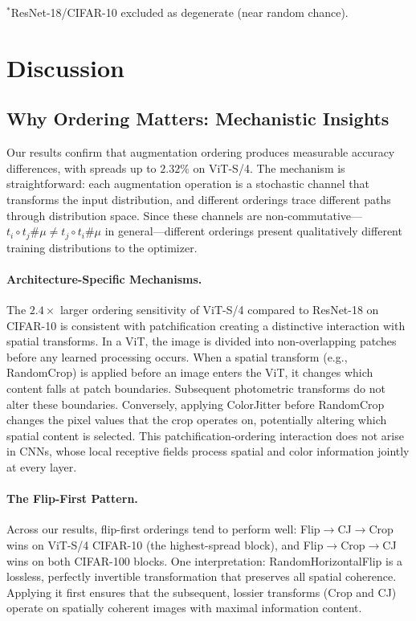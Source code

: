 \documentclass{article}
\begin{document}
$^*$ResNet-18/CIFAR-10 excluded as degenerate (near random chance).

\section{Discussion}

\subsection{Why Ordering Matters: Mechanistic Insights}

Our results confirm that augmentation ordering produces measurable accuracy differences, with spreads up to $2.32\%$ on ViT-S/4. The mechanism is straightforward: each augmentation operation is a stochastic channel that transforms the input distribution, and different orderings trace different paths through distribution space. Since these channels are non-commutative---$t_i \circ t_j \# \mu \neq t_j \circ t_i \# \mu$ in general---different orderings present qualitatively different training distributions to the optimizer.

\paragraph{Architecture-Specific Mechanisms.}
The $2.4\times$ larger ordering sensitivity of ViT-S/4 compared to ResNet-18 on CIFAR-10 is consistent with patchification creating a distinctive interaction with spatial transforms. In a ViT, the image is divided into non-overlapping patches before any learned processing occurs. When a spatial transform (e.g., RandomCrop) is applied before an image enters the ViT, it changes which content falls at patch boundaries. Subsequent photometric transforms do not alter these boundaries. Conversely, applying ColorJitter before RandomCrop changes the pixel values that the crop operates on, potentially altering which spatial content is selected. This patchification-ordering interaction does not arise in CNNs, whose local receptive fields process spatial and color information jointly at every layer.

\paragraph{The Flip-First Pattern.}
Across our results, flip-first orderings tend to perform well: Flip$\to$CJ$\to$Crop wins on ViT-S/4 CIFAR-10 (the highest-spread block), and Flip$\to$Crop$\to$CJ wins on both CIFAR-100 blocks. One interpretation: RandomHorizontalFlip is a lossless, perfectly invertible transformation that preserves all spatial coherence. Applying it first ensures that the subsequent, lossier transforms (Crop and CJ) operate on spatially coherent images with maximal information content.
\end{document}
